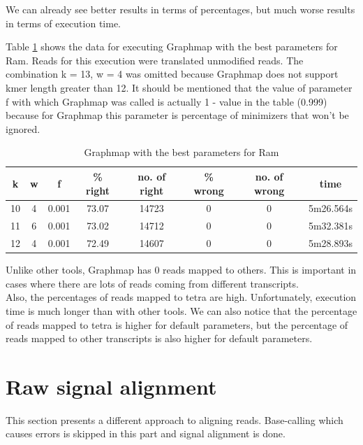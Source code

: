 \documentclass[times, utf8, zavrsni, numeric]{fer}
\begin{document}
We can already see better results in terms of percentages, but much worse results 
in terms of execution time.

Table \ref{graphmapRamParam} shows the data for executing Graphmap with the best parameters
for Ram. Reads for this execution were translated unmodified reads. The combination
k = 13, w = 4 was omitted because Graphmap does not support kmer length greater than 12. 
It should be mentioned that the value of parameter f with which Graphmap was called is
actually 1 - value in the table (0.999) because for Graphmap this parameter is percentage 
of minimizers that won't be ignored. 

\begin{longtable}{cccccccc}
    \caption{Graphmap with the best parameters for Ram}
    \label{graphmapRamParam} \\
    \hline \multicolumn{1}{c}{\textbf{k}} & \multicolumn{1}{c}{\textbf{w}} & 
    \multicolumn{1}{c}{\textbf{f}} & \multicolumn{1}{c}{\textbf{\% right}} & 
    \multicolumn{1}{c}{\textbf{no. of right}} & \multicolumn{1}{c}{\textbf{\% wrong}} & 
    \multicolumn{1}{c}{\textbf{no. of wrong}} & \multicolumn{1}{c}{\textbf{time}}  \\ \hline
    \endfirsthead
    10 & 4 & 0.001 & 73.07 & 14723 & 0 & 0 & 5m26.564s \\ \hline
    11 & 6 & 0.001 & 73.02 & 14712 & 0 & 0 & 5m32.381s \\ \hline
    12 & 4 & 0.001 & 72.49 & 14607 & 0 & 0 & 5m28.893s \\ \hline
\end{longtable}

Unlike other tools, Graphmap has 0 reads mapped to others. This is important
in cases where there are lots of reads coming from different transcripts. \\
Also, the percentages of reads mapped to tetra are high. Unfortunately, 
execution time is much longer than with other tools. 
We can also notice that the percentage of reads mapped to tetra is higher for default parameters,
but the percentage of reads mapped to other transcripts is also higher for default parameters.


\section{Raw signal alignment}
This section presents a different approach to aligning reads. 
Base-calling which causes errors is skipped in this part and signal alignment is done.
\end{document}
